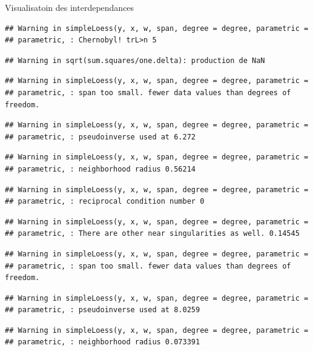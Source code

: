 \documentclass[11pt,ignorenonframetext,]{beamer}
\begin{document}
\begin{frame}[fragile]{Visualisatoin des interdependances}
\begin{verbatim}
## Warning in simpleLoess(y, x, w, span, degree = degree, parametric =
## parametric, : Chernobyl! trL>n 5
\end{verbatim}

\begin{verbatim}
## Warning in sqrt(sum.squares/one.delta): production de NaN
\end{verbatim}

\begin{verbatim}
## Warning in simpleLoess(y, x, w, span, degree = degree, parametric =
## parametric, : span too small. fewer data values than degrees of freedom.
\end{verbatim}

\begin{verbatim}
## Warning in simpleLoess(y, x, w, span, degree = degree, parametric =
## parametric, : pseudoinverse used at 6.272
\end{verbatim}

\begin{verbatim}
## Warning in simpleLoess(y, x, w, span, degree = degree, parametric =
## parametric, : neighborhood radius 0.56214
\end{verbatim}

\begin{verbatim}
## Warning in simpleLoess(y, x, w, span, degree = degree, parametric =
## parametric, : reciprocal condition number 0
\end{verbatim}

\begin{verbatim}
## Warning in simpleLoess(y, x, w, span, degree = degree, parametric =
## parametric, : There are other near singularities as well. 0.14545
\end{verbatim}

\begin{verbatim}
## Warning in simpleLoess(y, x, w, span, degree = degree, parametric =
## parametric, : span too small. fewer data values than degrees of freedom.
\end{verbatim}

\begin{verbatim}
## Warning in simpleLoess(y, x, w, span, degree = degree, parametric =
## parametric, : pseudoinverse used at 8.0259
\end{verbatim}

\begin{verbatim}
## Warning in simpleLoess(y, x, w, span, degree = degree, parametric =
## parametric, : neighborhood radius 0.073391
\end{verbatim}


\end{frame}
\end{document}
